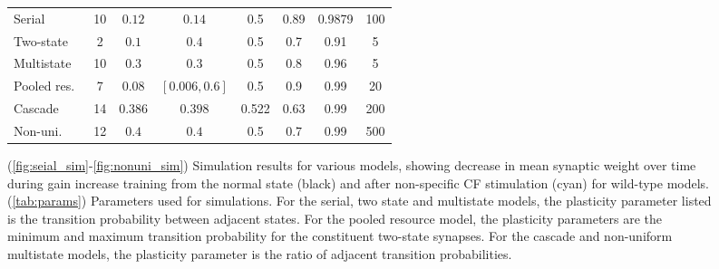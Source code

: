\documentclass[10pt]{article}
\begin{document}
\begin{figure}[p]
\begin{myenuma}
{\begin{tabular}{|l|c|c|c|c|c|c|c|}
    \cline{1-8}
    Serial       & 10 & $0.12$  & $0.14$        & 0.5   & 0.89 & 0.9879 & 100 \\
    Two-state    & 2  & $0.1$   & $0.4$         & 0.5   & 0.7  & 0.91   & 5   \\
    Multistate   & 10 & $0.3$   & $0.3$         & 0.5   & 0.8  & 0.96   & 5   \\
    Pooled res.\ & 7  & $0.08$  & $[0.006,0.6]$ & 0.5   & 0.9  & 0.99   & 20  \\
    Cascade      & 14 & $0.386$ & $0.398$       & 0.522 & 0.63 & 0.99   & 200  \\ 
    Non-uni.\    & 12 & $0.4$   & $0.4$         & 0.5   & 0.7  & 0.99   & 500  \\
    \cline{1-8}
  \end{tabular}}
  \end{myenuma}
  \caption[Simulation results for various models]{(\ref{fig:seial_sim}-\ref{fig:nonuni_sim}) Simulation results for various models, showing decrease in mean synaptic weight over time during gain increase training from the normal state (black) and after non-specific CF stimulation (cyan) for wild-type models.
  (\ref{tab:params}) Parameters used for simulations.
  For the serial, two state and multistate models, the plasticity parameter listed is the transition probability between adjacent states.
  For the pooled resource model, the plasticity parameters are the minimum and maximum transition probability for the constituent two-state synapses.
  For the cascade and non-uniform multistate models, the plasticity parameter is the ratio of adjacent transition probabilities.}\label{fig:sim_ChR2}
\end{figure}








\end{document}
